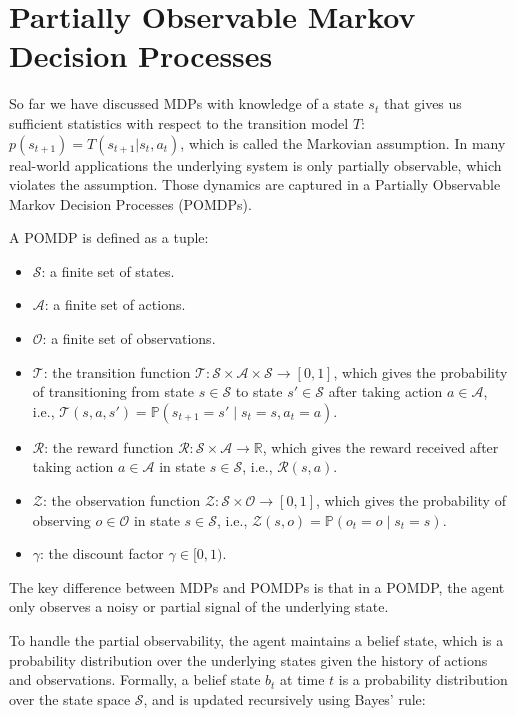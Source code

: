 \section{Partially Observable Markov Decision Processes}
So far we have discussed MDPs with knowledge of a state $s_t$ that gives us sufficient statistics with respect to the 
transition model $T$: $p(s_{t+1}) = T(s_{t+1}|s_t, a_t)$, which is called the Markovian assumption. In many real-world applications the underlying system 
is only partially observable, which violates the assumption. Those dynamics are captured in a Partially Observable Markov Decision Processes (POMDPs).

A POMDP is defined as a tuple:

\begin{itemize}
\item $\mathcal{S}$: a finite set of states.
\item $\mathcal{A}$: a finite set of actions.
\item $\mathcal{O}$: a finite set of observations.
\item $\mathcal{T}$: the transition function $\mathcal{T}: \mathcal{S} \times \mathcal{A} \times \mathcal{S} \rightarrow [0, 1]$, which gives the probability of transitioning from state $s \in \mathcal{S}$ to state $s' \in \mathcal{S}$ after taking action $a \in \mathcal{A}$, i.e., $\mathcal{T}(s, a, s') = \mathbb{P}(s_{t+1} = s' \mid s_t = s, a_t = a)$.
\item $\mathcal{R}$: the reward function $\mathcal{R}: \mathcal{S} \times \mathcal{A} \rightarrow \mathbb{R}$, which gives the reward received after taking action $a \in \mathcal{A}$ in state $s \in \mathcal{S}$, i.e., $\mathcal{R}(s, a)$.
\item $\mathcal{Z}$: the observation function $\mathcal{Z}: \mathcal{S} \times \mathcal{O} \rightarrow [0, 1]$, which gives the probability of observing $o \in \mathcal{O}$ in state $s \in \mathcal{S}$, i.e., $\mathcal{Z}(s, o) = \mathbb{P}(o_{t} = o \mid s_t = s)$.
\item $\gamma$: the discount factor $\gamma \in [0, 1)$.
\end{itemize}

The key difference between MDPs and POMDPs is that in a POMDP, the agent only observes a noisy or partial signal of the underlying state.

To handle the partial observability, the agent maintains a belief state, which is a probability distribution over the underlying states given the history of actions and observations. Formally, a belief state $b_t$ at time $t$ is a probability distribution over the state space $\mathcal{S}$, and is updated recursively using Bayes' rule:

